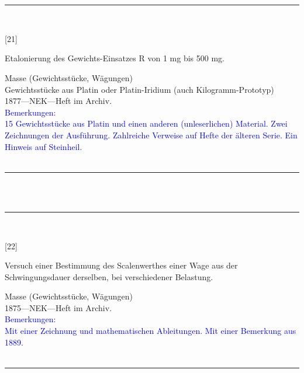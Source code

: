 \\
\vspace*{-2.5pt}\\
\parbox{\textwidth}{%
\rule{\textwidth}{1pt}\vspace*{-3mm}\\
\begin{minipage}[t]{0.15\textwidth}\vspace{0pt}
\Huge\rule[-4mm]{0cm}{1cm}[21]
\end{minipage}
\hfill
\begin{minipage}[t]{0.85\textwidth}\vspace{0pt}
\large Etalonierung des Gewichts-Einsatzes {\glqq}R{\grqq} von 1 mg bis 500 mg.\rule[-2mm]{0mm}{2mm}
\end{minipage}
{\footnotesize\flushright
Masse (Gewichtsstücke, Wägungen)\\
Gewichtsstücke aus Platin oder Platin-Iridium (auch Kilogramm-Prototyp)\\
}
1877\quad---\quad NEK\quad---\quad Heft im Archiv.\\
\textcolor{blue}{Bemerkungen:\\{}
15 Gewichtsstücke aus Platin und einen anderen (unleserlichen) Material. Zwei Zeichnungen der Ausführung. Zahlreiche Verweise auf Hefte der älteren Serie. Ein Hinweis auf Steinheil.\\{}
}
\\[-15pt]
\rule{\textwidth}{1pt}
}
\\
\vspace*{-2.5pt}\\
\parbox{\textwidth}{%
\rule{\textwidth}{1pt}\vspace*{-3mm}\\
\begin{minipage}[t]{0.15\textwidth}\vspace{0pt}
\Huge\rule[-4mm]{0cm}{1cm}[22]
\end{minipage}
\hfill
\begin{minipage}[t]{0.85\textwidth}\vspace{0pt}
\large Versuch einer Bestimmung des Scalenwerthes einer Wage aus der Schwingungsdauer derselben, bei verschiedener Belastung.\rule[-2mm]{0mm}{2mm}
\end{minipage}
{\footnotesize\flushright
Masse (Gewichtsstücke, Wägungen)\\
}
1875\quad---\quad NEK\quad---\quad Heft im Archiv.\\
\textcolor{blue}{Bemerkungen:\\{}
Mit einer Zeichnung und mathematischen Ableitungen. Mit einer Bemerkung aus 1889.\\{}
}
\\[-15pt]
\rule{\textwidth}{1pt}
}
